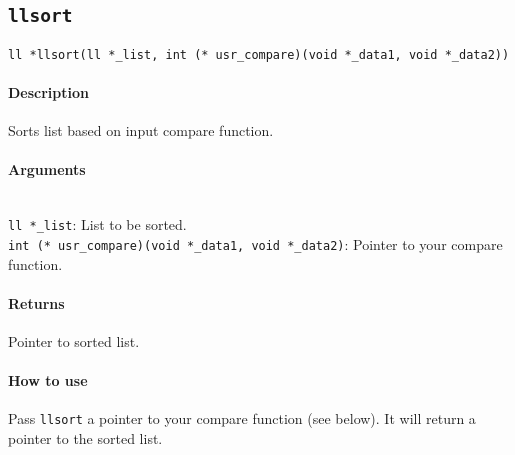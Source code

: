 \documentclass{article}
\begin{document}
\subsection{\texttt{llsort}}
\label{llsort}
\verb|ll *llsort(ll *_list, int (* usr_compare)(void *_data1, void *_data2))|

\paragraph{Description}
Sorts list based on input compare function.

\paragraph{Arguments}
\verb| |\\
\verb|ll *_list|: List to be sorted.\\
\verb|int (* usr_compare)(void *_data1, void *_data2)|: Pointer to your compare function. 

\paragraph{Returns}

Pointer to sorted list.

\paragraph{How to use}

Pass \verb|llsort| a pointer to your compare function (see below). It will return a pointer to the
sorted list. 
\end{document}
